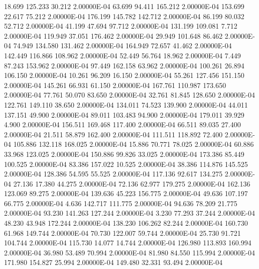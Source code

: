     18.699   125.233    30.212  2.00000E-04
    63.699    94.411   165.212  2.00000E-04
   153.699    22.617    75.212  2.00000E-04
   176.199   145.782   142.712  2.00000E-04
    86.199    80.032    52.712  2.00000E-04
    41.199    47.694    97.712  2.00000E-04
   131.199   109.081     7.712  2.00000E-04
   119.949    37.051   176.462  2.00000E-04
    29.949   101.648    86.462  2.00000E-04
    74.949   134.580   131.462  2.00000E-04
   164.949    72.657    41.462  2.00000E-04
   142.449   116.866   108.962  2.00000E-04
    52.449    56.764    18.962  2.00000E-04
     7.449    87.243   153.962  2.00000E-04
    97.449   162.158    63.962  2.00000E-04
   100.261    26.894   106.150  2.00000E-04
    10.261    96.209    16.150  2.00000E-04
    55.261   127.456   151.150  2.00000E-04
   145.261    66.931    61.150  2.00000E-04
   167.761   110.987   173.650  2.00000E-04
    77.761    50.070    83.650  2.00000E-04
    32.761    81.845   128.650  2.00000E-04
   122.761   149.110    38.650  2.00000E-04
   134.011    74.523   139.900  2.00000E-04
    44.011   137.151    49.900  2.00000E-04
    89.011   103.483    94.900  2.00000E-04
   179.011    39.929     4.900  2.00000E-04
   156.511   169.468   117.400  2.00000E-04
    66.511    89.035    27.400  2.00000E-04
    21.511    58.879   162.400  2.00000E-04
   111.511   118.892    72.400  2.00000E-04
   105.886   132.118   168.025  2.00000E-04
    15.886    70.771    78.025  2.00000E-04
    60.886    33.968   123.025  2.00000E-04
   150.886    99.826    33.025  2.00000E-04
   173.386    85.449   100.525  2.00000E-04
    83.386   157.022    10.525  2.00000E-04
    38.386   114.876   145.525  2.00000E-04
   128.386    54.595    55.525  2.00000E-04
   117.136    92.617   134.275  2.00000E-04
    27.136    17.380    44.275  2.00000E-04
    72.136    62.977   179.275  2.00000E-04
   162.136   123.069    89.275  2.00000E-04
   139.636    45.223   156.775  2.00000E-04
    49.636   107.197    66.775  2.00000E-04
     4.636   142.717   111.775  2.00000E-04
    94.636    78.209    21.775  2.00000E-04
    93.230   141.263   127.244  2.00000E-04
     3.230    77.293    37.244  2.00000E-04
    48.230    43.948   172.244  2.00000E-04
   138.230   106.262    82.244  2.00000E-04
   160.730    61.968   149.744  2.00000E-04
    70.730   122.007    59.744  2.00000E-04
    25.730    91.721   104.744  2.00000E-04
   115.730    14.077    14.744  2.00000E-04
   126.980   113.893   160.994  2.00000E-04
    36.980    53.489    70.994  2.00000E-04
    81.980    84.550   115.994  2.00000E-04
   171.980   154.827    25.994  2.00000E-04
   149.480    32.331    93.494  2.00000E-04
